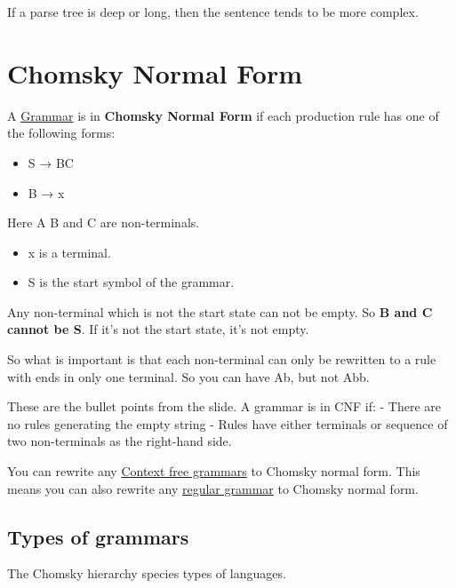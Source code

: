 \documentclass[
  11pt,
  british,
]{article}
\providecommand{\tightlist}{%
  \setlength{\itemsep}{0pt}\setlength{\parskip}{0pt}}
\begin{document}
If a parse tree is deep or long, then the sentence tends to be more
complex.

\hypertarget{chomsky-normal-form}{%
\section{Chomsky Normal Form}\label{chomsky-normal-form}}

A \href{Grammar.md}{Grammar} is in \textbf{Chomsky Normal Form} if each
production rule has one of the following forms:

\begin{itemize}
\tightlist
\item
  S → BC
\item
  B → x
\end{itemize}

Here A B and C are non-terminals.

\begin{itemize}
\tightlist
\item
  x is a terminal.
\item
  S is the start symbol of the grammar.
\end{itemize}

Any non-terminal which is not the start state can not be empty. So
\textbf{B and C cannot be S}. If it's not the start state, it's not
empty.

So what is important is that each non-terminal can only be rewritten to
a rule with ends in only one terminal. So you can have Ab, but not Abb.

These are the bullet points from the slide. A grammar is in CNF if: -
There are no rules generating the empty string - Rules have either
terminals or sequence of two non-terminals as the right-hand side.

You can rewrite any \href{Context\%20free\%20grammars.md}{Context free
grammars} to Chomsky normal form. This means you can also rewrite any
\href{Regular\%20Languages.md}{regular grammar} to Chomsky normal form.

\hypertarget{types-of-grammars}{%
\subsection{Types of grammars}\label{types-of-grammars}}

The Chomsky hierarchy species types of languages.
\end{document}
